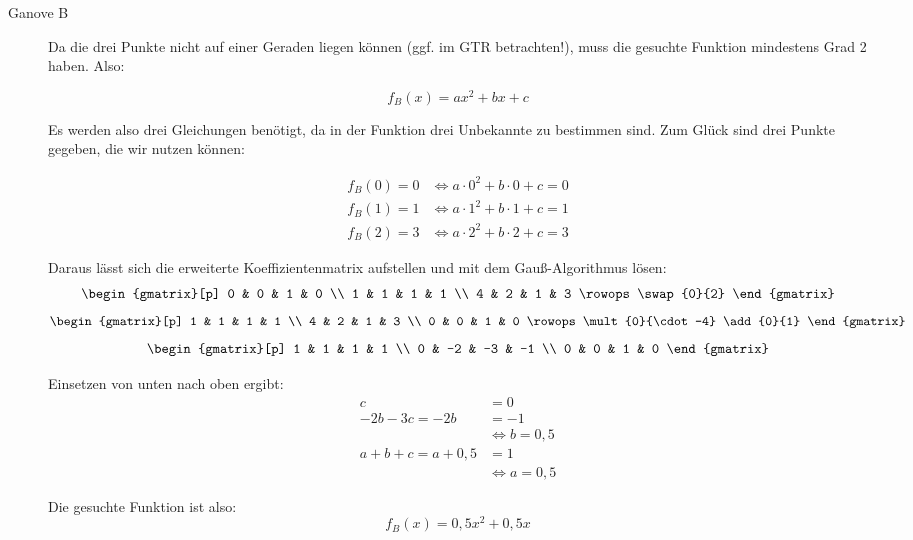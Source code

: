 \documentclass[11pt, a4paper,
]{scrartcl}
\begin{document}
\begin{aufgabe}
\begin{loesung}
\begin{description}
				\item[Ganove B]
				Da die drei Punkte nicht auf einer Geraden liegen können (ggf. im GTR betrachten!), muss die gesuchte Funktion mindestens Grad 2 haben. Also:
				
				\[ f_B(x) = ax^2 + bx + c \]
				
				Es werden also drei Gleichungen benötigt, da in der Funktion drei Unbekannte zu bestimmen sind. Zum Glück sind drei Punkte gegeben, die wir nutzen können:
				
				\begin{align*}
					f_B(0) = 0 &\Leftrightarrow a\cdot 0^2 + b\cdot 0 + c = 0 \\
					f_B(1) = 1 &\Leftrightarrow a\cdot 1^2 + b\cdot 1 + c = 1 \\
					f_B(2) = 3 &\Leftrightarrow a\cdot 2^2 + b\cdot 2 + c = 3
				\end{align*}
				
				Daraus lässt sich die erweiterte Koeffizientenmatrix aufstellen und mit dem Gauß-Algorithmus lösen:
				\[ \begin{gmatrix}[p]
				0 & 0 & 1 & 0 \\ 
				1 & 1 & 1 & 1 \\
				4 & 2 & 1 & 3
				\rowops
				\swap{0}{2}
				\end{gmatrix} \]
				\[ \begin{gmatrix}[p]
				1 & 1 & 1 & 1 \\
				4 & 2 & 1 & 3 \\
				0 & 0 & 1 & 0 
				\rowops
				\mult{0}{\cdot -4}
				\add{0}{1}
				\end{gmatrix} \]
				\[ \begin{gmatrix}[p]
				1 & 1 & 1 & 1 \\
				0 & -2 & -3 & -1 \\
				0 & 0 & 1 & 0 
				\end{gmatrix} \]
				
				Einsetzen von unten nach oben ergibt:
				\begin{align*}
				c &= 0 \\
				-2b - 3c = -2b &= -1 \\
				&\Leftrightarrow b = 0,5 \\
				a + b + c = a + 0,5 &= 1 \\
				&\Leftrightarrow a = 0,5
				\end{align*}
				
				Die gesuchte Funktion ist also:
				\[ f_B(x) = 0,5x^2 + 0,5x \]
				

\end{description}
\end{loesung}
\end{aufgabe}
\end{document}
